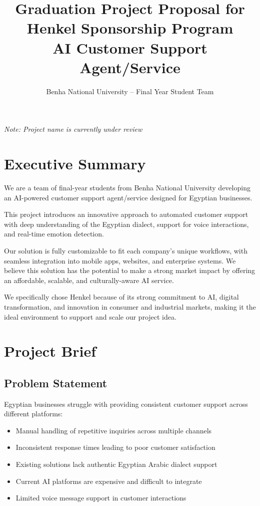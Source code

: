 \documentclass[12pt,a4paper]{article}
\title{Graduation Project Proposal for Henkel Sponsorship Program \\ 
\large AI Customer Support Agent/Service}
\author{Benha National University – Final Year Student Team}
\date{}
\begin{document}
\maketitle

\textit{Note: Project name is currently under review}

\section*{Executive Summary}
We are a team of final-year students from Benha National University developing an AI-powered customer support agent/service designed for Egyptian businesses. 

This project introduces an innovative approach to automated customer support with deep understanding of the Egyptian dialect, support for voice interactions, and real-time emotion detection. 

Our solution is fully customizable to fit each company’s unique workflows, with seamless integration into mobile apps, websites, and enterprise systems. We believe this solution has the potential to make a strong market impact by offering an affordable, scalable, and culturally-aware AI service. 

We specifically chose Henkel because of its strong commitment to AI, digital transformation, and innovation in consumer and industrial markets, making it the ideal environment to support and scale our project idea.

\section*{Project Brief}

\subsection*{Problem Statement}
Egyptian businesses struggle with providing consistent customer support across different platforms:
\begin{itemize}
    \item Manual handling of repetitive inquiries across multiple channels
    \item Inconsistent response times leading to poor customer satisfaction
    \item Existing solutions lack authentic Egyptian Arabic dialect support
    \item Current AI platforms are expensive and difficult to integrate
    \item Limited voice message support in customer interactions
\end{itemize}
\newpage
\end{document}
